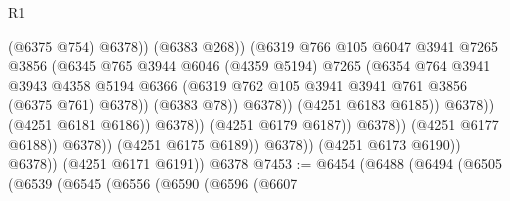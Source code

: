 \begin{lexlean}{R1}
\begin{coremodule}
                                                  (@6375 @754)
                                                  @6378))
                                              (@6383 @268))
                                            (@6319
                                              @766
                                              @105
                                              @6047
                                              @3941
                                              @7265
                                              @3856
                                              (@6345
                                                @765
                                                @3944
                                                @6046
                                                (@4359 @5194)
                                                @7265
                                                (@6354
                                                  @764
                                                  @3941
                                                  @3943
                                                  @4358
                                                  @5194
                                                  @6366
                                                  (@6319
                                                    @762
                                                    @105
                                                    @3941
                                                    @3941
                                                    @761
                                                    @3856
                                                    (@6375 @761)
                                                    @6378))
                                                (@6383 @78))
                                              @6378))
                                          (@4251 @6183 @6185))
                                        @6378))
                                    (@4251 @6181 @6186))
                                  @6378))
                              (@4251 @6179 @6187))
                            @6378))
                        (@4251 @6177 @6188))
                      @6378))
                  (@4251 @6175 @6189))
                @6378))
            (@4251 @6173 @6190))
          @6378))
      (@4251 @6171 @6191))
    @6378
@7453 := @6454
    (@6488
      (@6494
        (@6505
          (@6539
            (@6545
              (@6556
                (@6590
                  (@6596
                    (@6607

\end{coremodule}
\end{lexlean}
